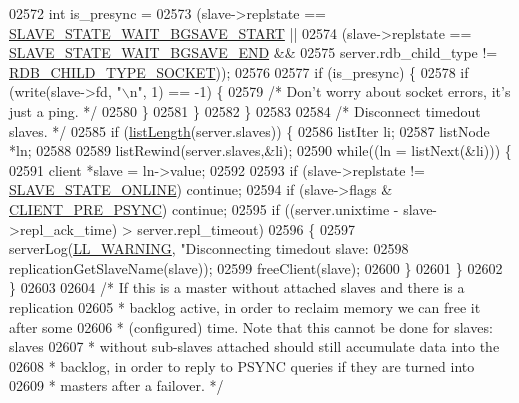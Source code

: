 \begin{DoxyCode}
{{{{{{{{{{{{{{{{{{{{{{{{{{{{{{{{{{{{{{{{{{{{{{{{{{{{{{{{{{{{{{{{{{{{{{{{{{{{02572         \textcolor{keywordtype}{int} is\_presync =
02573             (slave->replstate == \hyperlink{server_8h_a170ee2dd8cfefaf0d112edcc3152f8d7}{SLAVE\_STATE\_WAIT\_BGSAVE\_START} ||
02574             (slave->replstate == \hyperlink{server_8h_a2a1b586e8f326f831f6ab466c8c3f38a}{SLAVE\_STATE\_WAIT\_BGSAVE\_END} &&
02575              server.rdb\_child\_type != \hyperlink{server_8h_acdbf61346e1d2f54716e2ab6fe73e954}{RDB\_CHILD\_TYPE\_SOCKET}));
02576 
02577         \textcolor{keywordflow}{if} (is\_presync) \{
02578             \textcolor{keywordflow}{if} (write(slave->fd, \textcolor{stringliteral}{"\(\backslash\)n"}, 1) == -1) \{
02579                 \textcolor{comment}{/* Don't worry about socket errors, it's just a ping. */}
02580             \}
02581         \}
02582     \}
02583 
02584     \textcolor{comment}{/* Disconnect timedout slaves. */}
02585     \textcolor{keywordflow}{if} (\hyperlink{adlist_8h_afde0ab079f934670e82119b43120e94b}{listLength}(server.slaves)) \{
02586         listIter li;
02587         listNode *ln;
02588 
02589         listRewind(server.slaves,&li);
02590         \textcolor{keywordflow}{while}((ln = listNext(&li))) \{
02591             client *slave = ln->value;
02592 
02593             \textcolor{keywordflow}{if} (slave->replstate != \hyperlink{server_8h_ad895fdf16e5ed5275d19ddf8578b900f}{SLAVE\_STATE\_ONLINE}) \textcolor{keywordflow}{continue};
02594             \textcolor{keywordflow}{if} (slave->flags & \hyperlink{server_8h_ac13d62411270bd658f6d82e711e0f912}{CLIENT\_PRE\_PSYNC}) \textcolor{keywordflow}{continue};
02595             \textcolor{keywordflow}{if} ((server.unixtime - slave->repl\_ack\_time) > server.repl\_timeout)
02596             \{
02597                 serverLog(\hyperlink{server_8h_a31229b9334bba7d6be2a72970967a14b}{LL\_WARNING}, \textcolor{stringliteral}{"Disconnecting timedout slave: %
02598                     replicationGetSlaveName(slave));
02599                 freeClient(slave);
02600             \}
02601         \}
02602     \}
02603 
02604     \textcolor{comment}{/* If this is a master without attached slaves and there is a replication}
02605 \textcolor{comment}{     * backlog active, in order to reclaim memory we can free it after some}
02606 \textcolor{comment}{     * (configured) time. Note that this cannot be done for slaves: slaves}
02607 \textcolor{comment}{     * without sub-slaves attached should still accumulate data into the}
02608 \textcolor{comment}{     * backlog, in order to reply to PSYNC queries if they are turned into}
02609 \textcolor{comment}{     * masters after a failover. */}
}}}}}}}}}}}}}}}}}}}}}}}}}}}}}}}}}}}}}}}}}}}}}}}}}}}}}}}}}}}}}}}}}}}}}}}}}}}}}
\end{DoxyCode}
